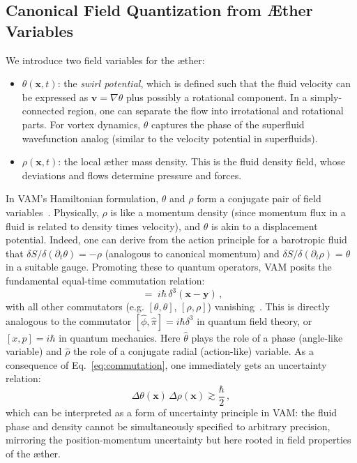\documentclass[preprint]{revtex4-2}
\begin{document}
    \subsection{Canonical Field Quantization from Æther Variables}
    We introduce two field variables for the æther:
    \begin{itemize}
        \item $\theta(\mathbf{x},t)$: the \emph{swirl potential}, which is defined such that the fluid velocity can be expressed as $\mathbf{v} = \nabla \theta$ plus possibly a rotational component. In a simply-connected region, one can separate the flow into irrotational and rotational parts. For vortex dynamics, $\theta$ captures the phase of the superfluid wavefunction analog (similar to the velocity potential in superfluids).
        \item $\rho(\mathbf{x},t)$: the local æther mass density. This is the fluid density field, whose deviations and flows determine pressure and forces.
    \end{itemize}
    In VAM’s Hamiltonian formulation, $\theta$ and $\rho$ form a conjugate pair of field variables~\cite{reference_57}. Physically, $\rho$ is like a momentum density (since momentum flux in a fluid is related to density times velocity), and $\theta$ is akin to a displacement potential. Indeed, one can derive from the action principle for a barotropic fluid that $\delta S / \delta (\partial_t \theta) = -\rho$ (analogous to canonical momentum) and $\delta S / \delta (\partial_t \rho) = \theta$ in a suitable gauge. Promoting these to quantum operators, VAM posits the fundamental equal-time commutation relation:
    \begin{equation}
    [\hat{\theta}(\mathbf{x}),\, \hat{\rho}(\mathbf{y})] \;=\; i \hbar \,\delta^3(\mathbf{x}-\mathbf{y})\,,
    \label{eq:commutation}
    \end{equation}
    with all other commutators (e.g. $[\theta,\theta]$, $[\rho,\rho]$) vanishing~\cite{reference_58}. This is directly analogous to the commutator $[ \hat{\phi}, \hat{\pi} ] = i\hbar \delta^3$ in quantum field theory, or $[x,p]=i\hbar$ in quantum mechanics. Here $\hat{\theta}$ plays the role of a phase (angle-like variable) and $\hat{\rho}$ the role of a conjugate radial (action-like) variable. As a consequence of Eq.~\eqref{eq:commutation}, one immediately gets an uncertainty relation:
    \[
        \Delta \theta(\mathbf{x}) \,\Delta \rho(\mathbf{x}) \gtrsim \frac{\hbar}{2}\,,
    \]
    which can be interpreted as a form of uncertainty principle in VAM: the fluid phase and density cannot be simultaneously specified to arbitrary precision, mirroring the position-momentum uncertainty but here rooted in field properties of the æther.
\end{document}
